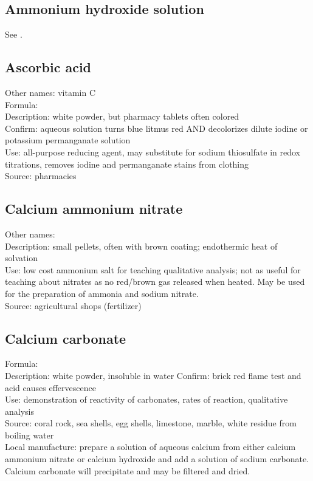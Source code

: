 \subsection*{Ammonium hydroxide solution}
See .
\subsection*{Ascorbic acid}
Other names: vitamin C\\
Formula: \\
Description: white powder, 
but pharmacy tablets often colored\\
Confirm: aqueous solution turns blue litmus red 
AND decolorizes dilute iodine or potassium permanganate solution\\
Use: all-purpose reducing agent, 
may substitute for sodium thiosulfate in redox titrations, 
removes iodine and permanganate stains from clothing\\
Source: pharmacies
\subsection*{Calcium ammonium nitrate}
Other names: \\
Description: small pellets, 
often with brown coating; 
endothermic heat of solvation\\
Use: low cost ammonium salt for teaching qualitative analysis; 
not as useful for teaching about nitrates 
as no red/brown gas released when heated. 
May be used for the preparation of ammonia and sodium nitrate.\\
Source: agricultural shops (fertilizer)\\
\subsection*{Calcium carbonate}
Formula: \\
Description: white powder, 
insoluble in water
Confirm: brick red flame test and acid causes effervescence\\
Use: demonstration of reactivity of carbonates, 
rates of reaction, 
qualitative analysis\\
Source: coral rock, 
sea shells, 
egg shells, 
limestone, 
marble, 
white residue from boiling water\\
Local manufacture: prepare a solution of aqueous calcium 
from either calcium ammonium nitrate or calcium hydroxide 
and add a solution of sodium carbonate.\\ 
Calcium carbonate will precipitate and may be filtered and dried.
